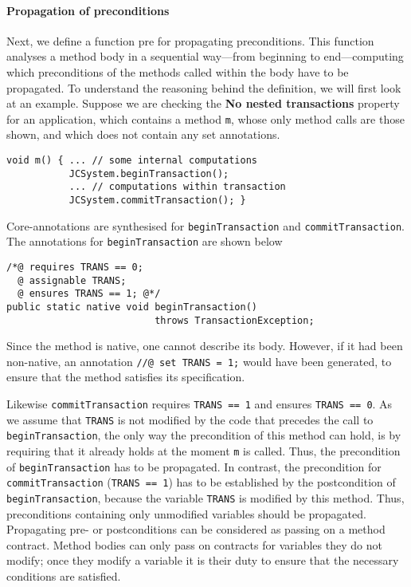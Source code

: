 \paragraph{Propagation of preconditions}
Next, we define a function \textsf{pre} for
propagating preconditions. This function analyses a
method body in a sequential way---from beginning to end---computing
which preconditions of the methods called within the body have to be
propagated. To understand the reasoning behind the definition, we will
first look at an example. Suppose we are checking the \textbf{No
nested transactions} property for an application, which contains a
method \texttt{m}, whose only method calls are those shown, and which
does not contain any set annotations.
\begin{verbatim}
void m() { ... // some internal computations
           JCSystem.beginTransaction();
           ... // computations within transaction
           JCSystem.commitTransaction(); }
\end{verbatim}
Core-annotations are synthesised for \texttt{beginTransaction}
and \texttt{commit\-Transaction}. The annotations for
\texttt{beginTransaction} are shown below
\begin{verbatim}
/*@ requires TRANS == 0;
  @ assignable TRANS;
  @ ensures TRANS == 1; @*/
public static native void beginTransaction() 
                          throws TransactionException;
\end{verbatim}
Since the method is native, one cannot describe its body. However, if
it had been non-native, an annotation \texttt{//@ set TRANS = 1;}
would have been generated, to ensure that the method satisfies its
specification.

Likewise \texttt{commitTransaction} requires \texttt{TRANS == 1}
and ensures \texttt{TRANS == 0}. As we assume that \texttt{TRANS} is
not modified by the code that precedes the call to
\texttt{beginTransaction},  the only way the precondition of this method
can hold, is by requiring that it already holds at the moment
\texttt{m} is called. Thus, the precondition of
\texttt{beginTransaction} has to be propagated. In contrast, the
precondition for \texttt{commitTransaction} (\texttt{TRANS == 1})
has to be established by the postcondition of
\texttt{begin\-Transaction}, because the variable \texttt{TRANS} is
modified by this method. %
Thus, preconditions containing only unmodified variables should be
propagated.  Propagating pre- or postconditions can be considered as
passing on a method contract. Method bodies can only pass on contracts
for variables they do not modify; once they modify a variable it is
their duty to ensure that the necessary conditions are satisfied.


